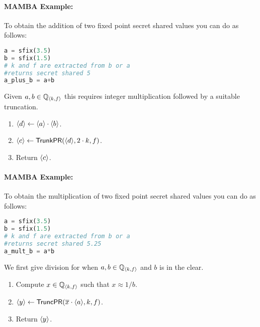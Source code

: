 \paragraph{MAMBA Example:} To obtain the addition of two fixed point secret shared values you can do as follows:
\begin{lstlisting}[language={python}]
a = sfix(3.5)
b = sfix(1.5)
# k and f are extracted from b or a
#returns secret shared 5
a_plus_b = a+b
\end{lstlisting}
Given $a, b \in {\mathbb{Q}}_{\langle k, f \rangle}$ this requires integer multiplication followed
by a suitable truncation.
\begin{enumerate}
\item $\langle d \rangle \leftarrow \langle a \rangle \cdot \langle b \rangle$.
\item $\langle c \rangle \leftarrow \mathsf{TrunkPR}(\langle d \rangle,2 \cdot k,f)$.
\item Return $\langle c \rangle$.
\end{enumerate}
\paragraph{MAMBA Example:} To obtain the multiplication of two fixed point secret shared values you can do as follows:
\begin{lstlisting}[language={python}]
a = sfix(3.5)
b = sfix(1.5)
# k and f are extracted from b or a
#returns secret shared 5.25
a_mult_b = a*b
\end{lstlisting}

We first give division for when $a, b \in {\mathbb{Q}}_{\langle k, f \rangle}$ and $b$ is in the clear.
\begin{enumerate}
\item Compute $x \in {\mathbb{Q}}_{\langle k, f \rangle}$ such that $x \approx 1/b$.
\item $\langle y \rangle \leftarrow \mathsf{TruncPR}(\overline{x} \cdot \langle a \rangle,k,f)$.
\item Return $\langle y \rangle$.
\end{enumerate}

